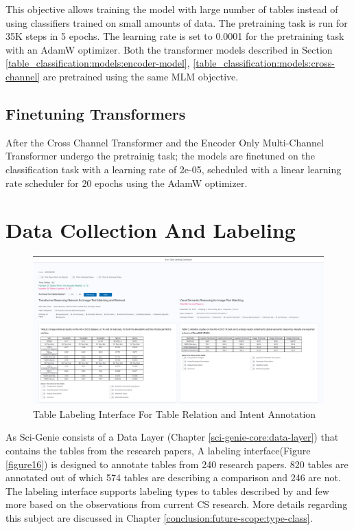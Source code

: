 This objective allows training the model with large number of tables instead of using classifiers trained on small amounts of data. The pretraining task is run for 35K steps in 5 epochs. The learning rate is set to 0.0001 for the pretraining task with an AdamW optimizer. Both the transformer models described in Section \ref{table_classification:models:encoder-model}, \ref{table_classification:models:cross-channel} are pretrained using the same MLM objective. 

\subsection{Finetuning Transformers}
After the Cross Channel Transformer and the Encoder Only Multi-Channel Transformer undergo the pretrainig task; the models are finetuned on the classification task with a learning rate of 2e-05, scheduled with a linear learning rate scheduler for 20 epochs using the AdamW optimizer. 

\section{Data Collection And Labeling}
\label{table_classification:data-coll}

\begin{figure}[h]
    \centering
    \includegraphics[width=\maxwidth{\textwidth}]{src/images/table-lable-exp.pdf}
    \caption{Table Labeling Interface For Table Relation and Intent Annotation}
    \label{figure\arabic{figurecounter}}
\end{figure}

As Sci-Genie consists of a Data Layer (Chapter \ref{sci-genie-core:data-layer}) that contains the tables from the research papers, A labeling interface(Figure \ref{figure16}) is designed to annotate tables from 240 research papers. 820 tables are annotated out of which 574 tables are describing a comparison and 246 are not. The labeling interface supports labeling types to tables described by \cite{kim2012scientific} and few more based on the observations from current CS research. More details regarding this subject are discussed in Chapter \ref{conclusion:future-scope:type-class}. 

